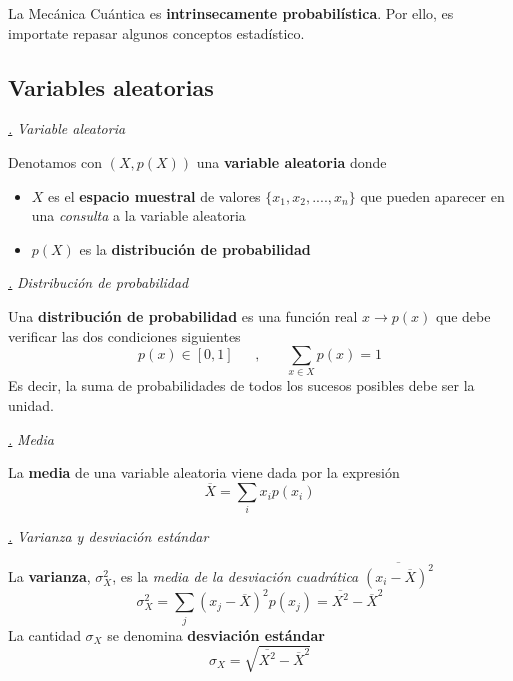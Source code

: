 \documentclass[a4paper,11pt]{book} %
\numberwithin{equation}{chapter}
\def\subsubiContadorIt{\par\addtocounter{subsubsection}{1}\underline{\it\thesubsubsection.}\hskip0.5cm \setcounter{subsubsubsectionIt}{0}}
\newcommand{\SubsubiIt}[1]{
		\subsubiContadorIt \textit{#1}
	}
\newcounter{subsubsubsectionIt}[subsubsection]
\begin{document}
La Mecánica Cuántica es \textbf{intrinsecamente probabilística}. Por ello, es importate repasar algunos conceptos estadístico.

		\subsection{Variables aleatorias}

			\SubsubiIt{Variable aleatoria}
		
	\begin{mybox_gray2}{}
	Denotamos con $(X,p(X))$ una  \textbf{variable aleatoria} donde
\begin{itemize}
	\item $X$ es el \textbf{espacio muestral} de valores $\{x_1, x_2,....,x_n\}$ que pueden aparecer en una \textit{consulta} a la variable aleatoria
	
	\item $p(X)$ es la \textbf{distribución de probabilidad}
\end{itemize}
	\end{mybox_gray2}


	
			\SubsubiIt{Distribución de probabilidad}

	\begin{mybox_gray2}{}
Una \textbf{distribución de probabilidad} es una función real $x\to p(x)$ que debe  verificar las dos condiciones siguientes
	\begin{equation}
	p(x) \in [0,1]~~~~~~~,~~~~~~~~\sum_{x\in X }p(x) = 1 
	\end{equation}
Es decir, la suma de probabilidades de todos los sucesos posibles debe ser la unidad.
	\end{mybox_gray2}

			\SubsubiIt{Media}

	\begin{mybox_gray2}{}
La \textbf{media} de una variable aleatoria  viene dada por la expresión 
	\begin{equation}
	\overline X  = \sum_i x_i p(x_i)
	\end{equation}
	\end{mybox_gray2}	


			\SubsubiIt{Varianza y desviación estándar}
		
	\begin{mybox_gray2}{}
La \textbf{varianza}, $\sigma_X^2$, es la  \textit{media de la desviación cuadrática} $\overline{(x_i - \overline{X} )^2}$ 
	\begin{equation}
	\sigma^2_X = \sum_j (x_j-\overline{X})^2 p(x_j) = \overline{X^2} - \overline{X}^2
	\end{equation}
La cantidad $\sigma_X$ se denomina  \textbf{desviación estándar}
	\begin{equation}
	\sigma_X = \sqrt{\overline{X^2} - \overline{X}^2}
	\end{equation}
	\end{mybox_gray2}			
			
\end{document}
